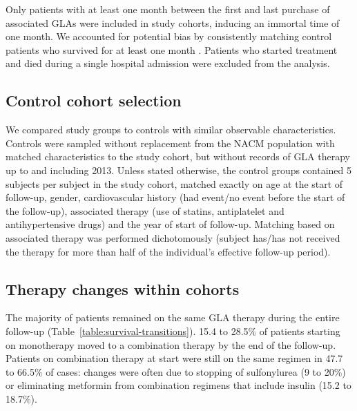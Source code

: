 Only patients with at least one month between the first and last purchase of associated GLAs were included in study cohorts, inducing an immortal time of one month. We accounted for potential bias by consistently matching control patients who survived for at least one month \citep{s11,s12}. Patients who started treatment and died during a single hospital admission were excluded from the analysis. 

\subsection{Control cohort selection}
We compared study groups to controls with similar observable characteristics. Controls were sampled without replacement from the NACM population with matched characteristics to the study cohort, but without records of GLA therapy up to and including 2013.  
Unless stated otherwise, the control groups contained 5 subjects per subject in the study cohort, matched exactly on age at the start of follow-up, gender, cardiovascular history (had event/no event before the start of the follow-up), associated therapy (use of statins, antiplatelet and antihypertensive drugs) and the year of start of follow-up. Matching based on associated therapy was performed dichotomously (subject has/has not received the therapy for more than half of the individual's effective follow-up period).

\subsection{Therapy changes within cohorts}
The majority of patients remained on the same GLA therapy during the entire follow-up (Table~\ref{table:survival-transitions}). 15.4 to 28.5\% of patients starting on monotherapy moved to a combination therapy by the end of the follow-up. Patients on combination therapy at start were still on the same regimen in 47.7 to 66.5\% of cases: changes were often due to stopping of sulfonylurea (9 to 20\%) or eliminating metformin from combination regimens that include insulin (15.2 to 18.7\%). 

